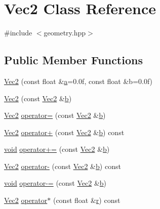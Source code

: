 \hypertarget{class_vec2}{\section{Vec2 Class Reference}
\label{class_vec2}
}


{\ttfamily \#include $<$geometry.\-hpp$>$}

\subsection*{Public Member Functions}
\begin{DoxyCompactItemize}
\item 
\hyperlink{class_vec2_afe739adad9af7fad1d650316e71e5508}{Vec2} (const float \&\hyperlink{_s_d_l__opengl__glext_8h_a3309789fc188587d666cda5ece79cf82}{a}=0.\-0f, const float \&b=0.\-0f)
\item 
\hyperlink{class_vec2_a1edfe6fe8bcdcf7b57c77f21ecee5d1e}{Vec2} (const \hyperlink{class_vec2}{Vec2} \&\hyperlink{_s_d_l__opengl__glext_8h_a0f71581a41fd2264c8944126dabbd010}{b})
\item 
\hyperlink{class_vec2}{Vec2} \hyperlink{class_vec2_a8ee317878ba125ee6f7f58d9196b0780}{operator=} (const \hyperlink{class_vec2}{Vec2} \&\hyperlink{_s_d_l__opengl__glext_8h_a0f71581a41fd2264c8944126dabbd010}{b})
\item 
\hyperlink{class_vec2}{Vec2} \hyperlink{class_vec2_adbe0d20401273c7fe53945bcf296ee5f}{operator+} (const \hyperlink{class_vec2}{Vec2} \&\hyperlink{_s_d_l__opengl__glext_8h_a0f71581a41fd2264c8944126dabbd010}{b}) const 
\item 
\hyperlink{_s_d_l__opengles2__gl2ext_8h_ae5d8fa23ad07c48bb609509eae494c95}{void} \hyperlink{class_vec2_a73c008611ffb6f9197c892082e980005}{operator+=} (const \hyperlink{class_vec2}{Vec2} \&\hyperlink{_s_d_l__opengl__glext_8h_a0f71581a41fd2264c8944126dabbd010}{b})
\item 
\hyperlink{class_vec2}{Vec2} \hyperlink{class_vec2_a7073dcdfd1bd207506eeeaa619add999}{operator-\/} (const \hyperlink{class_vec2}{Vec2} \&\hyperlink{_s_d_l__opengl__glext_8h_a0f71581a41fd2264c8944126dabbd010}{b}) const 
\item 
\hyperlink{_s_d_l__opengles2__gl2ext_8h_ae5d8fa23ad07c48bb609509eae494c95}{void} \hyperlink{class_vec2_ae422fb97124c7882531dd24bf3e13d4d}{operator-\/=} (const \hyperlink{class_vec2}{Vec2} \&\hyperlink{_s_d_l__opengl__glext_8h_a0f71581a41fd2264c8944126dabbd010}{b})
\item 
\hyperlink{class_vec2}{Vec2} \hyperlink{class_vec2_a1e268273b0cb3c4e074505ebb3f713f0}{operator$\ast$} (const float \&\hyperlink{_s_d_l__opengl_8h_a42ce7cdc612e53abee15043f80220d97}{r}) const 

\end{DoxyCompactItemize}
